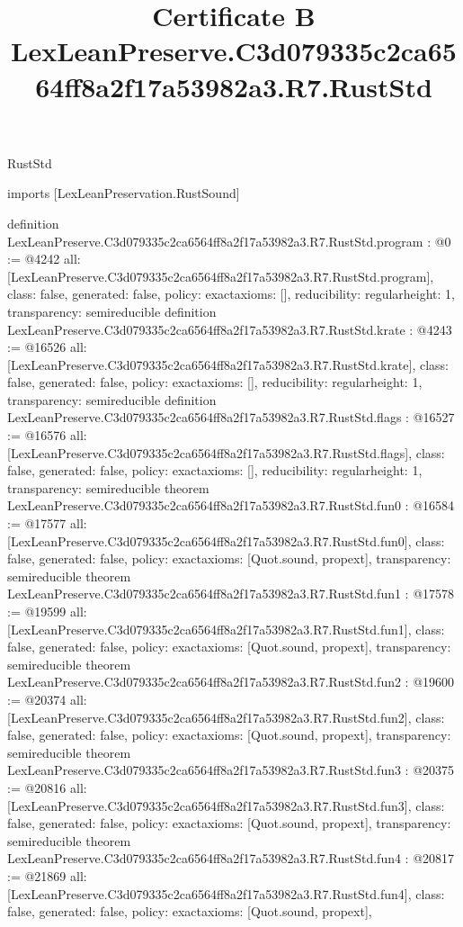 \begin{lexlean}{RustStd}
\title{Certificate B LexLeanPreserve.C3d079335c2ca6564ff8a2f17a53982a3.R7.RustStd}
\begin{coremodule}
imports [LexLeanPreservation.RustSound]

definition LexLeanPreserve.C3d079335c2ca6564ff8a2f17a53982a3.R7.RustStd.program : @0 := @4242 {
  all: [LexLeanPreserve.C3d079335c2ca6564ff8a2f17a53982a3.R7.RustStd.program],
  class: false,
  generated: false,
  policy: exact{axioms: []},
  reducibility: regular{height: 1},
  transparency: semireducible
}
definition LexLeanPreserve.C3d079335c2ca6564ff8a2f17a53982a3.R7.RustStd.krate : @4243 := @16526 {
  all: [LexLeanPreserve.C3d079335c2ca6564ff8a2f17a53982a3.R7.RustStd.krate],
  class: false,
  generated: false,
  policy: exact{axioms: []},
  reducibility: regular{height: 1},
  transparency: semireducible
}
definition LexLeanPreserve.C3d079335c2ca6564ff8a2f17a53982a3.R7.RustStd.flags : @16527 := @16576 {
  all: [LexLeanPreserve.C3d079335c2ca6564ff8a2f17a53982a3.R7.RustStd.flags],
  class: false,
  generated: false,
  policy: exact{axioms: []},
  reducibility: regular{height: 1},
  transparency: semireducible
}
theorem LexLeanPreserve.C3d079335c2ca6564ff8a2f17a53982a3.R7.RustStd.fun0 : @16584 := @17577 {
  all: [LexLeanPreserve.C3d079335c2ca6564ff8a2f17a53982a3.R7.RustStd.fun0],
  class: false,
  generated: false,
  policy: exact{axioms: [Quot.sound, propext]},
  transparency: semireducible
}
theorem LexLeanPreserve.C3d079335c2ca6564ff8a2f17a53982a3.R7.RustStd.fun1 : @17578 := @19599 {
  all: [LexLeanPreserve.C3d079335c2ca6564ff8a2f17a53982a3.R7.RustStd.fun1],
  class: false,
  generated: false,
  policy: exact{axioms: [Quot.sound, propext]},
  transparency: semireducible
}
theorem LexLeanPreserve.C3d079335c2ca6564ff8a2f17a53982a3.R7.RustStd.fun2 : @19600 := @20374 {
  all: [LexLeanPreserve.C3d079335c2ca6564ff8a2f17a53982a3.R7.RustStd.fun2],
  class: false,
  generated: false,
  policy: exact{axioms: [Quot.sound, propext]},
  transparency: semireducible
}
theorem LexLeanPreserve.C3d079335c2ca6564ff8a2f17a53982a3.R7.RustStd.fun3 : @20375 := @20816 {
  all: [LexLeanPreserve.C3d079335c2ca6564ff8a2f17a53982a3.R7.RustStd.fun3],
  class: false,
  generated: false,
  policy: exact{axioms: [Quot.sound, propext]},
  transparency: semireducible
}
theorem LexLeanPreserve.C3d079335c2ca6564ff8a2f17a53982a3.R7.RustStd.fun4 : @20817 := @21869 {
  all: [LexLeanPreserve.C3d079335c2ca6564ff8a2f17a53982a3.R7.RustStd.fun4],
  class: false,
  generated: false,
  policy: exact{axioms: [Quot.sound, propext]},
}
\end{coremodule}
\end{lexlean}
